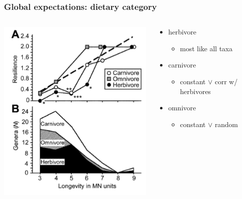 \documentclass{beamer}
\begin{document}
\begin{frame}
  \frametitle{Global expectations: dietary category}

  \begin{columns}
    \begin{column}{0.6\textwidth}
      \includegraphics[height=0.7\textheight,width=\textwidth,keepaspectratio=true]{figure/jernvall}

      \tiny{}
    \end{column}
    \begin{column}{0.4\textwidth}
      \begin{itemize}
        \item herbivore
          \begin{itemize}
            \item most like all taxa
          \end{itemize}
        \item carnivore
          \begin{itemize}
            \item constant \(\lor\) corr w/ herbivores
          \end{itemize}
        \item omnivore
          \begin{itemize}
            \item constant \(\lor\) random
          \end{itemize}
      \end{itemize}
    \end{column}
  \end{columns}
\end{frame}
\end{document}
